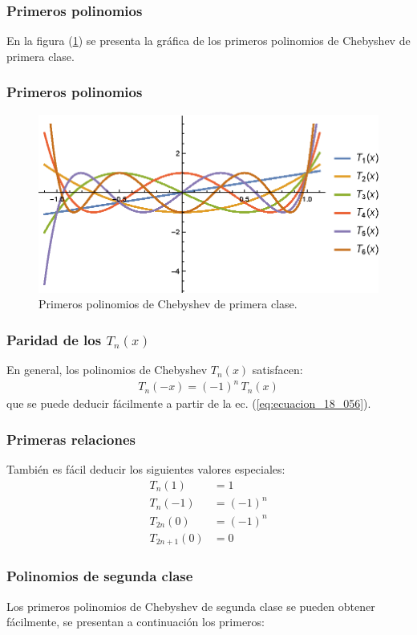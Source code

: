 \documentclass[12pt]{beamer}
\begin{document}
\begin{frame}
\frametitle{Primeros polinomios}
En la figura (\ref{fig:figura_plot_chebychev_01}) se presenta la gráfica de los primeros polinomios de Chebyshev de primera clase.
\end{frame}
\begin{frame}
\frametitle{Primeros polinomios}
\begin{figure}[H]
    \centering
    \includegraphics[scale=0.85]{Imagenes/Plot_Polinomios_Chebychev_01.eps}
    \caption{Primeros polinomios de Chebyshev de primera clase.}
    \label{fig:figura_plot_chebychev_01}
\end{figure}
\end{frame}
\begin{frame}
\frametitle{Paridad de los $T_{n} (x)$}
En general, los polinomios de Chebyshev $T_{n} (x)$ satisfacen:
\pause
\begin{align*}
T_{n} (-x) = (-1)^{n} \, T_{n} (x)
\end{align*}
que se puede deducir fácilmente a partir de la ec. (\ref{eq:ecuacion_18_056}).
\end{frame}
\begin{frame}
    \frametitle{Primeras relaciones}
También es fácil deducir los siguientes valores especiales:
\pause
\begin{align*}
T_{n} (1) &= 1 \\[0.5em]
T_{n} (-1) &= (-1)^{n} \\[0.5em]
T_{2n} (0) &= (-1)^{n} \\[0.5em]
T_{2n+1} (0) &= 0
\end{align*}
\end{frame}
\begin{frame}
\frametitle{Polinomios de segunda clase}
Los primeros polinomios de Chebyshev de segunda clase se pueden obtener fácilmente, se presentan a continuación los primeros:
\end{frame}
\end{document}
